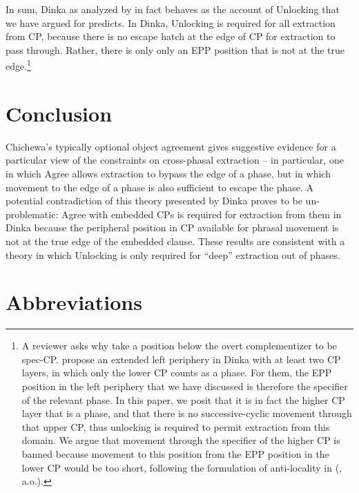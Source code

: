 \documentclass[output=paper,colorlinks,citecolor=brown]{langscibook}
\begin{document}
In sum, Dinka as analyzed by \citeauthor{VanUrkRichards2015} in fact behaves as the account of Unlocking that we have argued for predicts. In Dinka, Unlocking is required for all extraction from CP, because there is no escape hatch at the edge of CP for extraction to pass through. Rather, there is only only an EPP position that is not at the true edge.\footnote{A reviewer asks why \citeauthor{VanUrkRichards2015} take a position below the overt complementizer to be spec-CP. \citeauthor{VanUrkRichards2015} propose an extended left periphery in Dinka with at least two CP layers, in which only the lower CP counts as a phase. For them, the EPP position in the left periphery that we have discussed is therefore the specifier of the relevant phase. In this paper, we posit that it is in fact the higher CP layer that is a phase, and that there is no successive-cyclic movement through that upper CP, thus unlocking is required to permit extraction from this domain. We argue that movement through the specifier of the higher CP is banned because movement to this position from the EPP position in the lower CP would be too short, following the formulation of anti-locality in \citeauthor{Erlewine2016} (\citeyear{Erlewine2016}, a.o.).}

\section{Conclusion}\label{sec:branan:6}

Chichewa's typically optional object agreement gives suggestive evidence for a particular view of the constraints on cross-phasal extraction -- in particular, one in which Agree allows extraction to bypass the edge of a phase, but in which movement to the edge of a phase is also sufficient to escape the phase. A potential contradiction of this theory presented by Dinka proves to be un-problematic: Agree with embedded CPs is required for extraction from them in Dinka because the peripheral position in CP available for phrasal movement is not at the true edge of the embedded clause. These results are consistent with a theory in which Unlocking is only required for “deep” extraction out of phases.

\section*{Abbreviations}\largerpage
\end{document}
